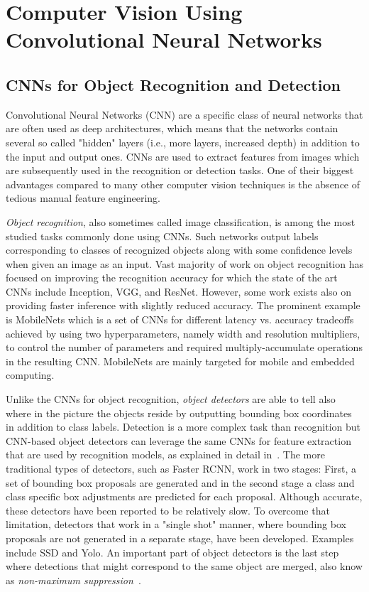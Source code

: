 \documentclass[sigconf]{acmart}
\begin{document}
\section{Computer Vision Using Convolutional Neural Networks}\label{sec:background}\subsection{CNNs for Object Recognition and Detection}

Convolutional Neural Networks (CNN) are a specific class of neural networks that are often used as deep architectures, which means that the networks contain several so called "hidden" layers (i.e., more layers, increased depth) in addition to the input and output ones.
CNNs are used to extract features from images which are subsequently used in the recognition or detection tasks. One of their biggest advantages compared to many other computer vision techniques is the absence of tedious manual feature engineering.

\textit{Object recognition}, also sometimes called image classification, is among the most studied tasks commonly done using CNNs. Such networks output labels corresponding to classes of recognized objects along with some confidence levels when given an image as an input. Vast majority of work on object recognition has focused on improving the recognition accuracy for which the state of the art CNNs include Inception\cite{Szegedy_2015_CVPR,pmlr-v37-ioffe15,Szegedy_2016_CVPR}, VGG, and ResNet. However, some work exists also on providing faster inference with slightly reduced accuracy. The prominent example is MobileNets\cite{howard17mobilenets} which is a set of CNNs for different latency vs. accuracy tradeoffs achieved by using two hyperparameters, namely width and resolution multipliers, to control the number of parameters and required multiply-accumulate operations in the resulting CNN. MobileNets are mainly targeted for mobile and embedded computing.

Unlike the CNNs for object recognition, \textit{object detectors} are able to tell also where in the picture the objects reside by outputting bounding box coordinates in addition to class labels. Detection is a more complex task than recognition but CNN-based object detectors can leverage the same CNNs for feature extraction that are used by recognition models, as explained in detail in~\cite{Huang2017CVPR}. The more traditional types of detectors, such as Faster RCNN\cite{ren17frcnn}, work in two stages: First, a set of bounding box proposals are generated and in the second stage a class and class specific box adjustments are predicted for each proposal. Although accurate, these detectors have been reported to be relatively slow. To overcome that limitation, detectors that work in a "single shot" manner, where bounding box proposals are not generated in a separate stage, have been developed. Examples include SSD\cite{liu16ssd} and Yolo\cite{redmon16CVPR}. An important part of object detectors is the last step where detections that might correspond to the same object are merged, also know as \textit{non-maximum suppression}~\cite{HosangBS17}.
\end{document}

